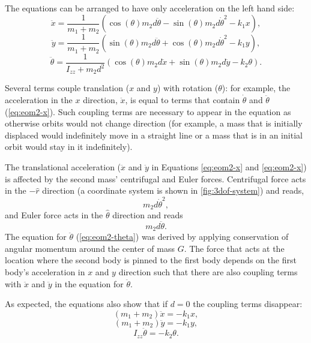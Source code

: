 \documentclass{article}
\begin{document}
The equations can be arranged to have only acceleration on the left hand side:
\begin{equation}
    \ddot{x} = \frac{1}{m_1 + m_2} \left( \cos(\theta) m_2 d \ddot{\theta} - \sin(\theta) m_2 d \dot{\theta}^2 - k_1 x \right),\label{eq:eom2-x}
\end{equation}
\begin{equation}
   \ddot{y} = \frac{1}{m_1 + m_2} \left(\sin(\theta) m_2 d \ddot{\theta} + \cos(\theta) m_2 d \dot{\theta}^2 - k_1 y \right),\label{eq:eom2-y}
\end{equation}
\begin{equation}
    \ddot{\theta} = \frac{1}{I_{zz} + m_2 d^2} \left(\cos(\theta) m_2 d \ddot{x} + \sin(\theta)m_2 d \ddot{y} - k_2 \theta \right). \label{eq:eom2-theta}
\end{equation}

Several terms couple translation ($x$ and $y$) with rotation ($\theta$): for example, the acceleration in the $x$ direction, $\ddot{x}$, is equal to terms that contain $\dot{\theta}$ and $\ddot{\theta}$ (\autoref{eq:eom2-x}). Such coupling terms are necessary to appear in the equation as otherwise orbits would not change direction (for example, a mass that is initially displaced would indefinitely move in a straight line or a mass that is in an initial orbit would stay in it indefinitely).
\par 
The translational acceleration ($\ddot{x}$ and $\ddot{y}$ in Equations \ref{eq:eom2-x} and \ref{eq:eom2-x}) is affected by the second mass' centrifugal and Euler forces. Centrifugal force acts in the $-\hat{r}$ direction (a coordinate system is shown in \autoref{fig:3dof-system}) and reads, 
\begin{equation}
    m_2 d \dot{\theta}^2,
\end{equation}
and Euler force acts in the $\hat{\theta}$ direction and reads
\begin{equation}
    m_2 d \ddot{\theta}.
\end{equation}
The equation for $\ddot{\theta}$ (\autoref{eq:eom2-theta}) was derived by applying conservation of angular momentum around the center of mass $G$. The force that acts at the location where the second body is pinned to the first body depends on the first body's acceleration in $x$ and $y$ direction such that there are also coupling terms with $\ddot{x}$ and $\ddot{y}$ in the equation for $\ddot{\theta}$.
\par 
As expected, the equations also show that if $d=0$ the coupling terms disappear:
\begin{equation}
    (m_1 + m_2) \ddot{x} = - k_1 x,
\end{equation}
\begin{equation}
   (m_1 + m_2) \ddot{y} = - k_1 y,
\end{equation}
\begin{equation}
    I_{zz}\ddot{\theta} = - k_2 \theta.
\end{equation}
\end{document}
